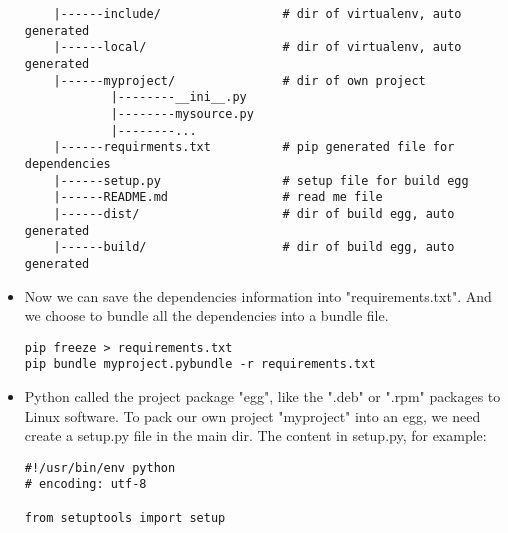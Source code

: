 \documentclass{article}
\begin{document}
\begin{itemize}
\begin{lstlisting}
    |------include/                 # dir of virtualenv, auto generated
    |------local/                   # dir of virtualenv, auto generated
    |------myproject/               # dir of own project 
            |--------__ini__.py
            |--------mysource.py
            |--------...
    |------requirments.txt          # pip generated file for dependencies
    |------setup.py                 # setup file for build egg
    |------README.md                # read me file
    |------dist/                    # dir of build egg, auto generated
    |------build/                   # dir of build egg, auto generated
\end{lstlisting}
\item
Now we can save the dependencies information into "requirements.txt". And we choose to bundle all the dependencies into a bundle file.
\begin{lstlisting}
pip freeze > requirements.txt
pip bundle myproject.pybundle -r requirements.txt
\end{lstlisting}
\item
Python called the project package "egg", like the ".deb" or ".rpm" packages to Linux software. 
To pack our own project "myproject" into an egg, we need create a setup.py file in the main dir.
The content in setup.py, for example:
\begin{lstlisting}
#!/usr/bin/env python
# encoding: utf-8

from setuptools import setup


\end{lstlisting}
\end{itemize}
\end{document}
